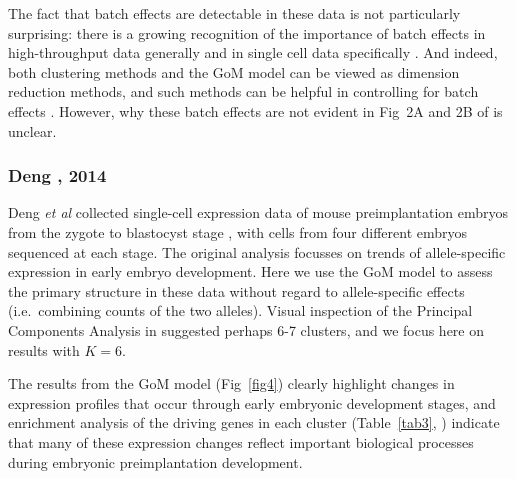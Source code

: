 \documentclass[10pt,letterpaper]{article}
\begin{document}


The fact that batch effects are detectable in these data is not particularly surprising: there is a growing recognition of the importance of batch effects in high-throughput data generally \cite{Leek2010} and in single cell data specifically \cite{Hicks2015}. And indeed, both clustering methods and the GoM model can be viewed as dimension reduction methods, and such methods can be helpful in controlling for batch effects \cite{Leek2007, Stegle2012}. However, why these batch effects are not evident in Fig~2A and 2B of \cite{Jaitin2014} is unclear.


\subsubsection*{Deng , 2014}

Deng \textit{et al} collected single-cell expression data of mouse preimplantation embryos from the zygote to blastocyst stage \cite{Deng2014}, with cells from four different embryos sequenced at each stage. The original analysis \cite{Deng2014} focusses on trends of allele-specific expression in early embryo development. Here we use the GoM model to assess the primary structure in these data without regard to allele-specific effects (i.e.~combining counts of the two alleles). Visual inspection of the Principal Components Analysis in \cite{Deng2014} suggested perhaps 6-7 clusters, and we focus here on results with $K=6$.

The results from the GoM model (Fig~\ref{fig4}) clearly highlight changes in expression profiles that occur through early embryonic development stages, and enrichment analysis of the driving genes in each cluster (Table~\ref{tab3},  ) indicate that many of these expression changes reflect important biological processes during embryonic preimplantation development.
\end{document}
